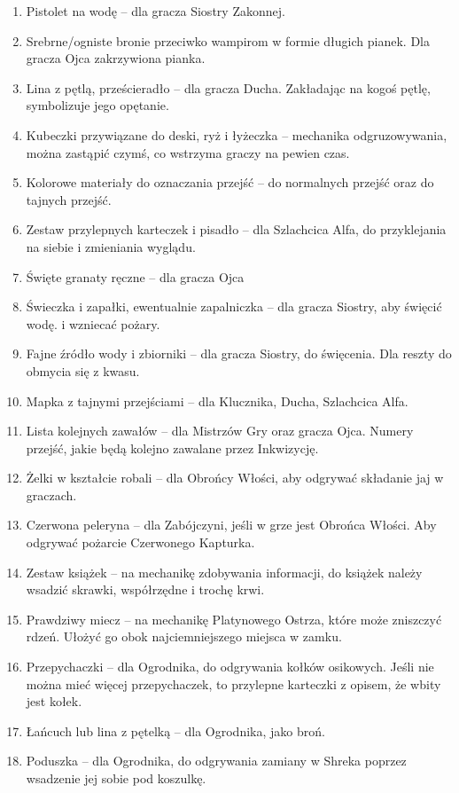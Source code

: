 \begin{enumerate}
		\item Pistolet na wodę -- dla gracza Siostry Zakonnej.
		\item Srebrne/ogniste bronie przeciwko wampirom w formie długich pianek. Dla gracza Ojca zakrzywiona pianka.
		\item Lina z pętlą, prześcieradło -- dla gracza Ducha. Zakładając na kogoś pętlę, symbolizuje jego opętanie.
		\item Kubeczki przywiązane do deski, ryż i łyżeczka -- mechanika odgruzowywania, można zastąpić czymś, co wstrzyma graczy na pewien czas.
		\item Kolorowe materiały do oznaczania przejść -- do normalnych przejść oraz do tajnych przejść.
		\item Zestaw przylepnych karteczek i pisadło -- dla Szlachcica Alfa, do przyklejania na siebie i zmieniania wyglądu.
		\item Święte granaty ręczne -- dla gracza Ojca
		\item Świeczka i zapałki, ewentualnie zapalniczka -- dla gracza Siostry, aby święcić wodę. i wzniecać pożary.
		\item Fajne źródło wody i zbiorniki -- dla gracza Siostry, do święcenia. Dla reszty do obmycia się z kwasu.
		\item Mapka z tajnymi przejściami -- dla Klucznika, Ducha, Szlachcica Alfa.
		\item Lista kolejnych zawałów -- dla Mistrzów Gry oraz gracza Ojca. Numery przejść, jakie będą kolejno zawalane przez Inkwizycję.
		\item Żelki w kształcie robali -- dla Obrońcy Włości, aby odgrywać składanie jaj w graczach.
		\item Czerwona peleryna -- dla Zabójczyni, jeśli w grze jest Obrońca Włości. Aby odgrywać pożarcie Czerwonego Kapturka.
		\item Zestaw książek -- na mechanikę zdobywania informacji, do książek należy wsadzić skrawki, współrzędne i trochę krwi.
		\item Prawdziwy miecz -- na mechanikę Platynowego Ostrza, które może zniszczyć rdzeń. Ułożyć go obok najciemniejszego miejsca w zamku.
		\item Przepychaczki -- dla Ogrodnika, do odgrywania kołków osikowych. Jeśli nie można mieć więcej przepychaczek, to przylepne karteczki z opisem, że wbity jest kołek.
		\item Łańcuch lub lina z pętelką -- dla Ogrodnika, jako broń.
		\item Poduszka -- dla Ogrodnika, do odgrywania zamiany w Shreka poprzez wsadzenie jej sobie pod koszulkę.

\end{enumerate}
